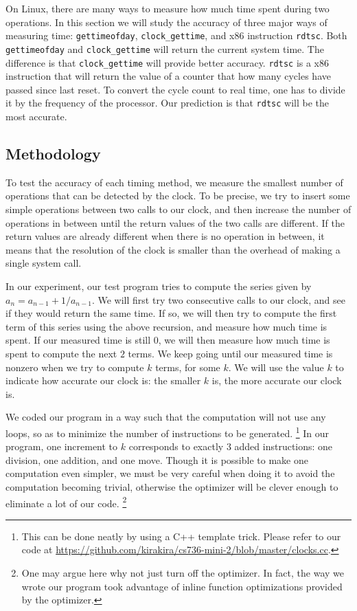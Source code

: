 \documentclass[11pt,conference]{IEEEtran}
\begin{document}
On Linux, there are many ways to measure how much time spent during two operations.
In this section we will study the accuracy of three major ways of measuring time: \texttt{gettimeofday}, \texttt{clock\_gettime}, and x86 instruction \texttt{rdtsc}.
Both \texttt{gettimeofday} and \texttt{clock\_gettime} will return the current system time.
The difference is that \texttt{clock\_gettime} will provide better accuracy.
\texttt{rdtsc} is a x86 instruction that will return the value of a counter that how many cycles have passed since last reset.
To convert the cycle count to real time, one has to divide it by the frequency of the processor.
Our prediction is that \texttt{rdtsc} will be the most accurate.

\subsection{Methodology}
To test the accuracy of each timing method, we measure the smallest number of operations that can be detected by the clock.
To be precise, we try to insert some simple operations between two calls to our clock, and then increase the number of operations in between until the return values of the two calls are different.
If the return values are already different when there is no operation in between, it means that the resolution of the clock is smaller than the overhead of making a single system call.

In our experiment, our test program tries to compute the series given by $a_n=a_{n-1}+1/a_{n-1}$.
We will first try two consecutive calls to our clock, and see if they would return the same time.
If so, we will then try to compute the first term of this series using the above recursion, and measure how much time is spent.
If our measured time is still $0$, we will then measure how much time is spent to compute the next $2$ terms.
We keep going until our measured time is nonzero when we try to compute $k$ terms, for some $k$.
We will use the value $k$ to indicate how accurate our clock is: the smaller $k$ is, the more accurate our clock is.

We coded our program in a way such that the computation will not use any loops, so as to minimize the number of instructions to be generated.
\footnote{This can be done neatly by using a C++ template trick.
Please refer to our code at \url{https://github.com/kirakira/cs736-mini-2/blob/master/clocks.cc}.}
In our program, one increment to $k$ corresponds to exactly $3$ added instructions: one division, one addition, and one move.
Though it is possible to make one computation even simpler, we must be very careful when doing it to avoid the computation becoming trivial, otherwise the optimizer will be clever enough to eliminate a lot of our code.
\footnote{One may argue here why not just turn off the optimizer.
In fact, the way we wrote our program took advantage of inline function optimizations provided by the optimizer.}
\end{document}
